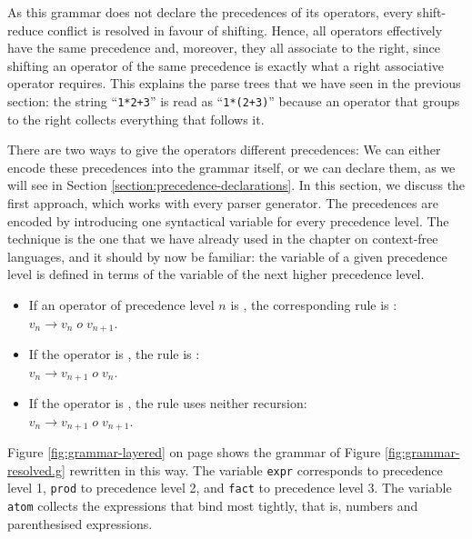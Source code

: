 \noindent
As this grammar does not declare the precedences of its operators, every shift-reduce conflict is resolved in
favour of shifting.  Hence, all operators effectively have the same precedence and, moreover, they all associate to the right, since shifting an operator of the same precedence
is exactly what a right associative operator requires.  This explains the parse trees that we have seen in the
previous section: the string ``\texttt{1*2+3}'' is read as ``\texttt{1*(2+3)}'' because an operator
that groups to the right collects everything that follows it.

There are two ways to give the operators different precedences:  We can either encode these precedences into
the grammar itself, or we can declare them, as we will see in Section \ref{section:precedence-declarations}.  In
this section, we discuss the first approach, which works with every parser generator.  The precedences are
encoded by introducing one syntactical variable for every precedence level.
The technique is the one that we have already used in the chapter on context-free languages, and it should by
now be familiar: the variable of a given precedence level is defined in terms of the variable of the next
higher precedence level.
\begin{itemize}
\item If an operator of precedence level $n$ is , the corresponding rule is
      :
      \\[0.2cm]
      \hspace*{1.3cm}
      $v_n \rightarrow v_n \;o\; v_{n+1}$.
\item If the operator is , the rule is :
      \\[0.2cm]
      \hspace*{1.3cm}
      $v_n \rightarrow v_{n+1} \;o\; v_n$.
\item If the operator is , the rule uses neither recursion:
      \\[0.2cm]
      \hspace*{1.3cm}
      $v_n \rightarrow v_{n+1} \;o\; v_{n+1}$.
\end{itemize}
Figure \ref{fig:grammar-layered} on page \pageref{fig:grammar-layered} shows the grammar of Figure
\ref{fig:grammar-resolved.g} rewritten in this way.  The variable \texttt{expr} corresponds to precedence level
1, \texttt{prod} to precedence level 2, and \texttt{fact} to precedence level 3.  The variable \texttt{atom}
collects the expressions that bind most tightly, that is, numbers and parenthesised expressions.


